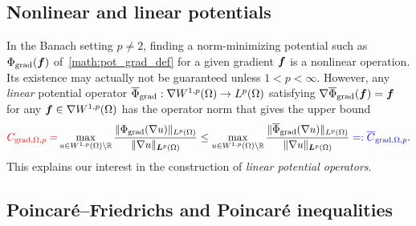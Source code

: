 \documentclass[10pt,a4paper]{article}
\newcommand\cye[1]{%
\protect\leavevmode
\begingroup
    \color{blue}%
    #1%
\endgroup
}
\newcommand{\mwl}[1]{{\color{red}#1}}
\begin{document}
\subsection{Nonlinear and linear potentials}

In the Banach setting $p \neq 2$, finding a norm-minimizing potential such as $\Phi_{\operatorname{grad}}( \bm{f} )$ of~\eqref{math:pot_grad_def} for a given gradient $\bm{f}$ is a nonlinear operation. Its existence may actually not be guaranteed unless $1 < p < \infty$. 
However, any \textit{linear} potential operator $\overline\Phi_{\operatorname{grad}} : \nabla W^{1,p}(\Omega) \rightarrow L^{p}(\Omega)$
satisfying $\nabla \overline\Phi_{\operatorname{grad}}( \bm{f} ) = \bm{f}$ for any $\bm{f} \in \nabla W^{1,p}(\Omega)$ has the operator norm that \cye{gives} the upper bound 
\begin{align}\label{math:PF_P}
    \mwl{C_{\grad,\Omega,p} = } 
    \max\limits_{ u \in W^{1,p}(\Omega) \setminus \bbR } 
    \frac{ \| \Phi_{\grad}(\nabla u) \|_{L^{p}(\Omega)} }{ \| \nabla u \|_{\fooL^{p}(\Omega)} }
    \leq 
    \max\limits_{ u \in W^{1,p}(\Omega) \setminus \bbR } 
    \frac{ \| \overline\Phi_{\grad}(\nabla u) \|_{L^{p}(\Omega)} }{ \| \nabla u \|_{\fooL^{p}(\Omega)} } \cye{=: \overline C_{\grad,\Omega,p}}
    .
\end{align}
This explains our interest in the construction of {\em linear potential operators}.

\subsection{Poincar\'e--Friedrichs and Poincar\'e inequalities}
\end{document}
